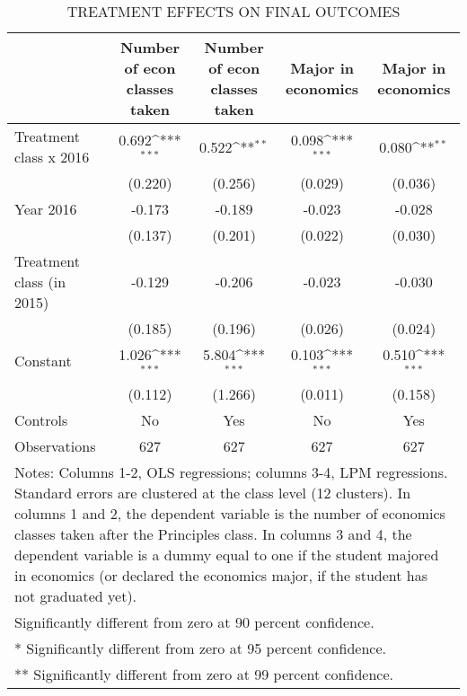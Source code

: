 \begin{table}[]
\caption{TREATMENT EFFECTS ON FINAL OUTCOMES}
{
\def\sym#1{\ifmmode^{#1}\else\(^{#1}\)\fi}
\begin{tabular}{@{\extracolsep{2pt}}l*{4}{c}@{}}
\hline\hline


 & Number of econ classes taken & Number of econ classes taken & Major in economics & Major in economics \\
\hline
Treatment class x 2016 & 0.692\sym{***} & 0.522\sym{**} & 0.098\sym{***} & 0.080\sym{**} \\
 & (0.220) & (0.256) & (0.029) & (0.036) \\
Year 2016 & -0.173 & -0.189 & -0.023 & -0.028 \\
 & (0.137) & (0.201) & (0.022) & (0.030) \\
Treatment class (in 2015) & -0.129 & -0.206 & -0.023 & -0.030 \\
 & (0.185) & (0.196) & (0.026) & (0.024) \\
Constant & 1.026\sym{***} & 5.804\sym{***} & 0.103\sym{***} & 0.510\sym{***} \\
 & (0.112) & (1.266) & (0.011) & (0.158) \\
Controls & No & Yes & No & Yes \\

\hline
Observations & 627 & 627 & 627 & 627 \\
\hline\hline
\multicolumn{5}{l}{\footnotesize Notes: Columns 1-2, OLS regressions; columns 3-4, LPM regressions. Standard errors are clustered at the class level (12 clusters). In columns 1 and 2, the dependent variable is the number of economics classes taken after the Principles class. In columns 3 and 4, the dependent variable is a dummy equal to one if the student majored in economics (or declared the economics major, if the student has not graduated yet).}\vspace{-.25em} \\
\multicolumn{5}{l}{\footnotesize * Significantly different from zero at 90 percent confidence.}\vspace{-.25em} \\
\multicolumn{5}{l}{\footnotesize ** Significantly different from zero at 95 percent confidence.}\vspace{-.25em} \\
\multicolumn{5}{l}{\footnotesize *** Significantly different from zero at 99 percent confidence.}
\end{tabular}
}
\end{table}